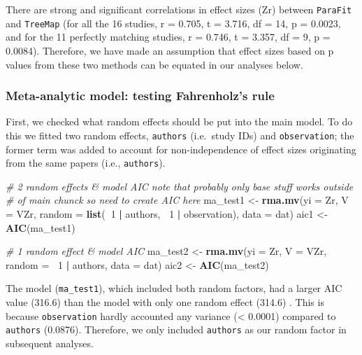 \documentclass[
]{article}
\newenvironment{Shaded}{\begin{snugshade}}{\end{snugshade}}
\newcommand{\CommentTok}[1]{\textcolor[rgb]{0.56,0.35,0.01}{\textit{#1}}}
\newcommand{\DataTypeTok}[1]{\textcolor[rgb]{0.13,0.29,0.53}{#1}}
\newcommand{\DecValTok}[1]{\textcolor[rgb]{0.00,0.00,0.81}{#1}}
\newcommand{\KeywordTok}[1]{\textcolor[rgb]{0.13,0.29,0.53}{\textbf{#1}}}
\newcommand{\NormalTok}[1]{#1}
\newcommand{\OperatorTok}[1]{\textcolor[rgb]{0.81,0.36,0.00}{\textbf{#1}}}
\newcommand{\StringTok}[1]{\textcolor[rgb]{0.31,0.60,0.02}{#1}}
\begin{document}
There are strong and significant correlations in effect sizes (Zr)
between \texttt{ParaFit} and \texttt{TreeMap} (for all the 16 studies, r
= 0.705, t = 3.716, df = 14, p = 0.0023, and for the 11 perfectly
matching studies, r = 0.746, t = 3.357, df = 9, p = 0.0084). Therefore,
we have made an assumption that effect sizes based on p values from
these two methods can be equated in our analyses below.

\hypertarget{meta-analytic-model-testing-fahrenholzs-rule}{%
\subsubsection{Meta-analytic model: testing Fahrenholz's
rule}\label{meta-analytic-model-testing-fahrenholzs-rule}}

First, we checked what random effects should be put into the main model.
To do this we fitted two random effects, \texttt{authors} (i.e.~study
IDs) and \texttt{observation}; the former term was added to account for
non-independence of effect sizes originating from the same papers (i.e.,
\texttt{authors}).

\begin{Shaded}
\begin{Highlighting}[]
\CommentTok{# 2 random effects & model AIC note that probably only base stuff works outside}
\CommentTok{# of main chunck so need to create AIC here}
\NormalTok{ma_test1 <-}\StringTok{ }\KeywordTok{rma.mv}\NormalTok{(}\DataTypeTok{yi =}\NormalTok{ Zr, }\DataTypeTok{V =}\NormalTok{ VZr, }\DataTypeTok{random =} \KeywordTok{list}\NormalTok{(}\OperatorTok{~}\DecValTok{1} \OperatorTok{|}\StringTok{ }\NormalTok{authors, }\OperatorTok{~}\DecValTok{1} \OperatorTok{|}\StringTok{ }\NormalTok{observation), }
    \DataTypeTok{data =}\NormalTok{ dat)}
\NormalTok{aic1 <-}\StringTok{ }\KeywordTok{AIC}\NormalTok{(ma_test1)}

\CommentTok{# 1 random effect & model AIC}
\NormalTok{ma_test2 <-}\StringTok{ }\KeywordTok{rma.mv}\NormalTok{(}\DataTypeTok{yi =}\NormalTok{ Zr, }\DataTypeTok{V =}\NormalTok{ VZr, }\DataTypeTok{random =} \OperatorTok{~}\DecValTok{1} \OperatorTok{|}\StringTok{ }\NormalTok{authors, }\DataTypeTok{data =}\NormalTok{ dat)}
\NormalTok{aic2 <-}\StringTok{ }\KeywordTok{AIC}\NormalTok{(ma_test2)}
\end{Highlighting}
\end{Shaded}

The model (\texttt{ma\_test1}), which included both random factors, had
a larger AIC value (316.6) than the model with only one random effect
(314.6) . This is because \texttt{observation} hardly accounted any
variance (\textless{} 0.0001) compared to \texttt{authors} (0.0876).
Therefore, we only included \texttt{authors} as our random factor in
subsequent analyses.
\end{document}
